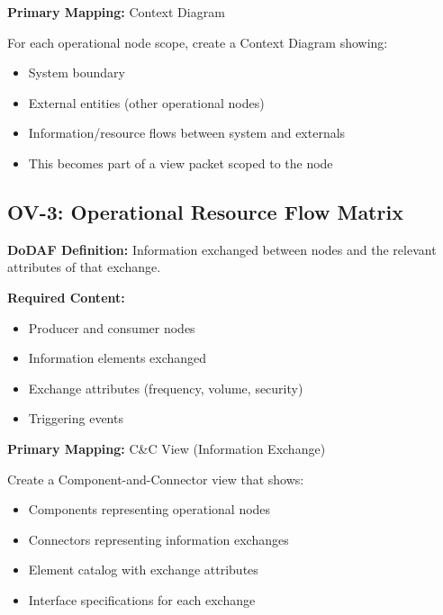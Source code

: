 \documentclass[11pt]{article}
\begin{document}
\begin{vbbox}
\textbf{Primary Mapping:} Context Diagram

For each operational node scope, create a Context Diagram showing:
\begin{itemize}
    \item System boundary
    \item External entities (other operational nodes)
    \item Information/resource flows between system and externals
    \item This becomes part of a view packet scoped to the node
\end{itemize}
\end{vbbox}

\subsection{OV-3: Operational Resource Flow Matrix}

\begin{dodafbox}
\textbf{DoDAF Definition:} Information exchanged between nodes and the relevant attributes of that exchange.

\textbf{Required Content:}
\begin{itemize}[nosep]
    \item Producer and consumer nodes
    \item Information elements exchanged
    \item Exchange attributes (frequency, volume, security)
    \item Triggering events
\end{itemize}
\end{dodafbox}

\begin{vbbox}
\textbf{Primary Mapping:} C\&C View (Information Exchange)

Create a Component-and-Connector view that shows:
\begin{itemize}
    \item Components representing operational nodes
    \item Connectors representing information exchanges
    \item Element catalog with exchange attributes
    \item Interface specifications for each exchange
\end{itemize}
\end{vbbox}
\end{document}

